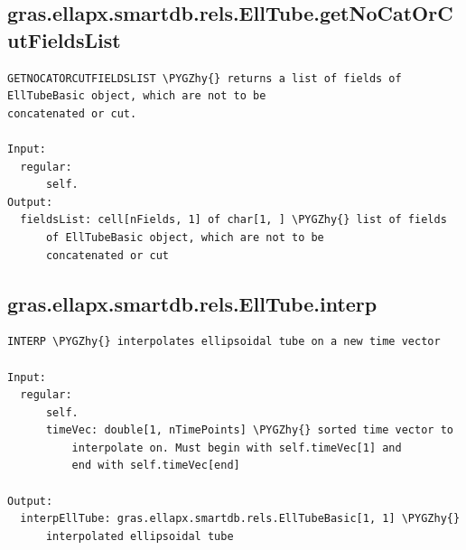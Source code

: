 \documentclass[letterpaper,10pt,english]{sphinxmanual}
\def\PYGZhy{\char`\-}
\begin{document}
\subsection{gras.ellapx.smartdb.rels.EllTube.getNoCatOrCutFieldsList}
\label{chap_functions:gras-ellapx-smartdb-rels-elltube-getnocatorcutfieldslist}
\begin{Verbatim}[commandchars=\\\{\}]
GETNOCATORCUTFIELDSLIST \PYGZhy{} returns a list of fields of
EllTubeBasic object, which are not to be
concatenated or cut.

Input:
  regular:
      self.
Output:
  fieldsList: cell[nFields, 1] of char[1, ] \PYGZhy{} list of fields
      of EllTubeBasic object, which are not to be
      concatenated or cut
\end{Verbatim}


\subsection{gras.ellapx.smartdb.rels.EllTube.interp}
\label{chap_functions:gras-ellapx-smartdb-rels-elltube-interp}
\begin{Verbatim}[commandchars=\\\{\}]
INTERP \PYGZhy{} interpolates ellipsoidal tube on a new time vector

Input:
  regular:
      self.
      timeVec: double[1, nTimePoints] \PYGZhy{} sorted time vector to
          interpolate on. Must begin with self.timeVec[1] and
          end with self.timeVec[end]

Output:
  interpEllTube: gras.ellapx.smartdb.rels.EllTubeBasic[1, 1] \PYGZhy{}
      interpolated ellipsoidal tube
\end{Verbatim}
\end{document}
